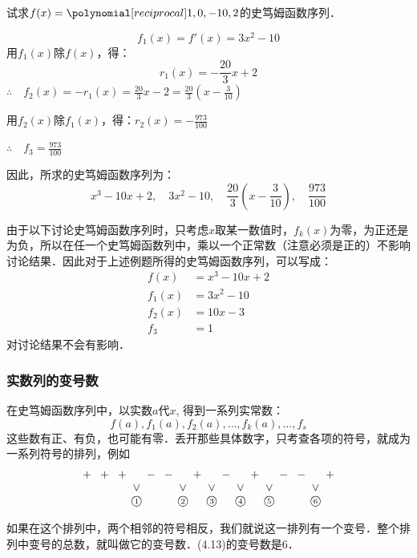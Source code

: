 \begin{example}
    试求$f(x)=\poly{1,0,-10,2}$的史笃姆函数序列．
\end{example}

\begin{solution}
\[f_1(x)=f'(x)=3x^2-10\]
用$f_1(x)$除$f(x)$，得：
\[r_1(x)=-\frac{20}{3}x+2\]
$\therefore\quad f_2(x)=-r_1(x)=\frac{20}{3}x-2=\frac{20}{3}\left(x-\frac{3}{10}\right)$

用$f_2(x)$除$f_1(x)$，得：$r_2(x)=-\frac{973}{100}$

$\therefore\quad f_3=\frac{973}{100}$    

因此，所求的史笃姆函数序列为：
\[x^3-10x+2,\quad 3x^2-10,\quad \frac{20}{3}\left(x-\frac{3}{10}\right),\quad \frac{973}{100}\]
\end{solution}

由于以下讨论史笃姆函数序列时，只考虑$x$取某一数值时，$f_k(x)$为零，为正还是为负，所以在任一个史笃姆函数列中，乘以一个正常数（注意必须是正的）不影响讨论结果．因此对于上述例题所得的史笃姆函数序列，可以写成：
\[\begin{split}
    f (x) &=x^3-10x+2\\
    f_1 (x) &=3x^2-10\\
    f_2 (x) &=10x-3\\
    f_3&=1
\end{split}\]
对讨论结果不会有影响．

\subsubsection{实数列的变号数}

在史笃姆函数序列中，以实数$a$代$x$, 得到一系列实常数：$$f(a),f_1(a),f_2(a),\ldots,f_k(a),\ldots, f_s$$ 这些数有正、有负，也可能有零．丢开那些具体数字，只考查各项的符号，就成为一系列符号的排列，例如
\begin{equation}
    \setlength{\arraycolsep}{2pt}
    \begin{array}{*{21}{c}}
    +&&+&&+&&-&&-&&+&&-&&+&&-&&-&&+\\
    &&&&&\vee&&&&\vee&&\vee&&\vee&&\vee&&&&\vee&\\
    &&&&&\text{\textcircled{\scriptsize 1}}&&&&\text{\textcircled{\scriptsize 2}}&&\text{\textcircled{\scriptsize 3}}&&\text{\textcircled{\scriptsize 4}}&&\text{\textcircled{\scriptsize 5}}&&&&\text{\textcircled{\scriptsize 6}}&
    \end{array}
\end{equation}

如果在这个排列中，两个相邻的符号相反，我们就说这一排列有一个变号．整个排列中变号的总数，就叫做它的变号数．(4.13)的变号数是6．

